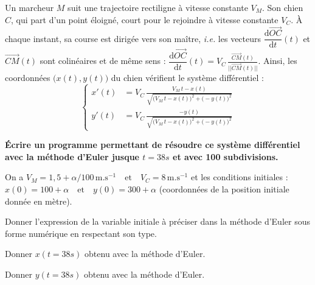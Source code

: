 Un marcheur $M$ suit une trajectoire rectiligne à vitesse constante $V_M$. Son chien $C$, qui part d'un point éloigné, court pour le rejoindre à vitesse constante $V_C$. \`{A} chaque instant, sa course est dirigée vers son maître, \textit{i.e.} les vecteurs $\dfrac{\text{d}\overrightarrow{OC}}{\text{d}t}(t)$ et $\overrightarrow{CM}(t)$ sont colinéaires et de même sens :
$ \dfrac{\text{d}\overrightarrow{OC}}{\text{d}t}(t)=V_C\,\frac{\overrightarrow{CM}(t)}{\vert\vert\overrightarrow{CM}(t)\vert\vert}$. 
Ainsi, les coordonnées $\big(x(t),y(t)\big)$ du chien vérifient le système différentiel :
\[ \left\{ \begin{aligned} x'(t)&=V_C\,\frac{V_M\,t-x(t)}{\sqrt{\big( V_M\,t-x(t) \big)^2+\big( -y(t) \big)^2}} \\ y'(t)&=V_C\,\frac{-y(t)}{\sqrt{\big( V_M\,t-x(t) \big)^2+\big( -y(t) \big)^2}} \end{aligned} \right. \]
 
 \textbf{\'{E}crire un programme permettant de résoudre ce système différentiel avec la méthode d'Euler jusque $t=38s$ et avec 100 subdivisions.}

On a $V_M=1{,}5+\alpha/100\,\text{m}.\text{s}^{-1} \quad \text{et} \quad V_C=8\,\text{m}.\text{s}^{-1} $
		et les conditions initiales :
		$ x(0)=100+\alpha  \quad \text{et} \quad y(0)=300+\alpha$ (coordonnées de la position initiale donnée en mètre). 

\question{} Donner l'expression de la variable initiale à préciser dans la méthode d'Euler sous forme numérique en respectant son type.

\question{} Donner $x(t=38s)$ obtenu avec la méthode d'Euler.

\question{} Donner $y(t=38s)$ obtenu avec la méthode d'Euler.